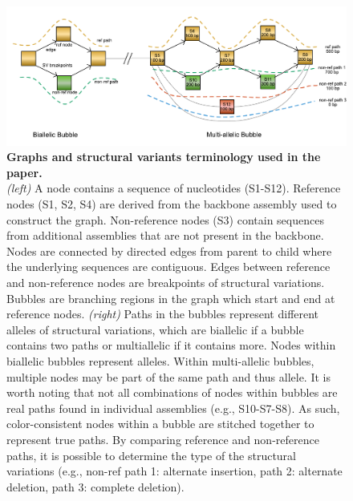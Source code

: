 \documentclass[../main.tex]{subfiles}
\begin{document}
\begin{flushleft}
\begin{figure}[!htb]
    \centering
    \includegraphics[width=\textwidth]{paper3/supplement/sp42.pdf}
    \caption[SV extraction procedures]{\textbf{Graphs and structural variants terminology used in the paper.} \\
    \small{\emph{(left)} A node contains a sequence of nucleotides (S1-S12). Reference nodes (S1, S2, S4) are derived from the backbone assembly used to construct the graph. Non-reference nodes (S3) contain sequences from additional assemblies that are not present in the backbone. Nodes are connected by directed edges from parent to child where the underlying sequences are contiguous. Edges between reference and non-reference nodes are breakpoints of structural variations. Bubbles are branching regions in the graph which start and end at reference nodes. \emph{(right)} Paths in the bubbles represent different alleles of structural variations, which are biallelic if a bubble contains two paths or multiallelic if it contains more. Nodes within biallelic bubbles represent alleles. Within multi-allelic bubbles, multiple nodes may be part of the same path and thus allele. It is worth noting that not all combinations of nodes within bubbles are real paths found in individual assemblies (e.g., S10-S7-S8). As such, color-consistent nodes within a bubble are stitched together to represent true paths. By comparing reference and non-reference paths, it is possible to determine the type of the structural variations (e.g., non-ref path 1: alternate insertion, path 2: alternate deletion, path 3: complete deletion).}}
    \label{sup_fig:s42}
\end{figure}



\end{flushleft}
\end{document}
